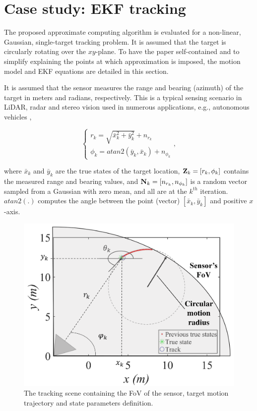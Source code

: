 \section{Case study: EKF tracking}
\label{sec:EKF}
The proposed approximate computing algorithm is evaluated for a non-linear, Gaussian, single-target tracking problem. It is assumed that the target is circularly rotating over the $xy$-plane. To have the paper self-contained and to simplify explaining the points at which approximation is imposed, the motion model and EKF equations are detailed in this section.

It is assumed that the sensor measures the range and bearing (azimuth) of the target in meters and radians, respectively. This is a typical sensing scenario in LiDAR, radar and stereo vision used in numerous applications, e.g., autonomous vehicles \cite{7398055},

\begin{equation}
\left\{
\begin{array}{l}
r_k = \sqrt{\bar{x}_k^2 + \bar{y}_k^2} + n_{r_k} \\
\phi_k = atan2(\bar{y}_k, \bar{x}_k) + n_{\phi_k}
\end{array}
\right.,
\label{eq:Meas}
\end{equation}

\noindent where $\bar{x}_k$ and $\bar{y}_k$ are the true states of the target location, ${\bf Z}_k = [r_k, \phi_k]$ contains the measured range and bearing values, and ${\bf N}_k = [n_{r_k}, n_{\phi_k}]$ is a random vector sampled from a Gaussian with zero mean, and all are at the $k^{th}$ iteration. $atan2(.)$ computes the angle between the point (vector) $[\bar{x}_k, \bar{y}_k]$ and positive $x$-axis.

\begin{figure}[tb]
  \centering
  \includegraphics[width=0.95\columnwidth]{img/Trackingfinal.png}
  \caption{The tracking scene containing the FoV of the sensor, target motion trajectory and state parameters definition.}
  \label{fig:TrackScene}
\end{figure}

